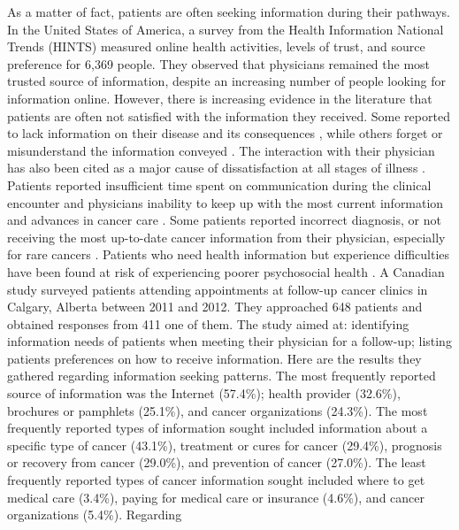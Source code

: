 As a matter of fact, patients are often seeking information during their
pathways. In the United States of America, a survey from the Health Information
National Trends (HINTS) \cite{hesse_trust_2005} measured online health
activities, levels of trust, and source preference for 6,369 people. They
observed that physicians remained the most trusted source of information,
despite an increasing number of people looking for information online.
However, there is increasing evidence in the literature that patients are often
not satisfied with the information they received. Some reported to lack
information on their disease and its consequences
\cite{mcpherson_effective_2001}, while others forget or misunderstand the
information conveyed \cite{ley_communicating_1988,hogbin_getting_1989}. The
interaction with their physician has also been cited as a major cause of
dissatisfaction \cite{stewart_effective_1995,bartlett_effects_1984} at all
stages of illness \cite{higginson_palliative_1990}. Patients reported
insufficient time spent on communication during the clinical encounter and
physicians inability to keep up with the most current information and advances
in cancer care \cite{anderson_impact_2003}. Some patients reported incorrect
diagnosis, or not receiving the most up-to-date cancer information from their
physician, especially for rare cancers \cite{dolce_internet_2011}. Patients who
need health information but experience difficulties have been found at risk of
experiencing poorer psychosocial health \cite{arora_barriers_2002}.
A Canadian study surveyed patients attending appointments at follow-up cancer
clinics in Calgary, Alberta \cite{sheabudgell_information_2014} between 2011 and
2012. They approached 648 patients and obtained responses from 411 one of them.
The study aimed at: identifying information needs of patients when meeting their
physician for a follow-up; listing patients preferences on how to receive
information. Here are the results they gathered regarding information seeking
patterns. The most frequently reported source of information was the Internet
(57.4\%); health provider (32.6\%), brochures or pamphlets (25.1\%), and cancer
organizations (24.3\%). The most frequently reported types of information sought
included information about a specific type of cancer (43.1\%), treatment or
cures for cancer (29.4\%), prognosis or recovery from cancer (29.0\%), and
prevention of cancer (27.0\%). The least frequently reported types of cancer
information sought included where to get medical care (3.4\%), paying for
medical care or insurance (4.6\%), and cancer organizations (5.4\%). Regarding
